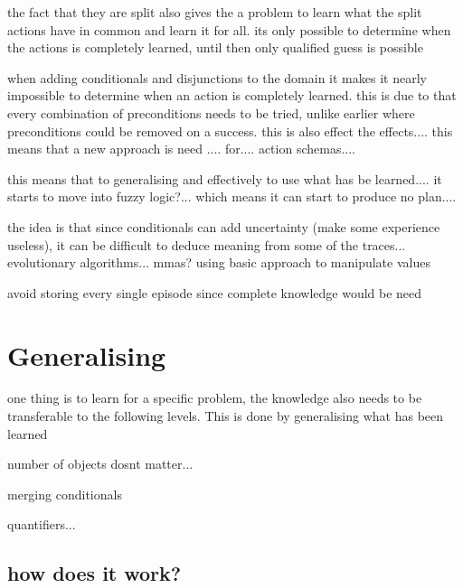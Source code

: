 	the fact that they are split also gives the a problem to learn what the split actions have in common and learn it for all. its only possible to determine when the actions is completely learned, until then only qualified guess is possible
	
	
	
	when adding conditionals and disjunctions to the domain it makes it nearly impossible to determine when an action is completely learned. this is due to that every combination of preconditions needs to be tried, unlike earlier where preconditions could be removed on a success. this is also effect the effects.... this means that a new approach is need .... for.... action schemas....  
	
	
	this means that to generalising and effectively to use what has be learned.... it starts to move into fuzzy logic?... which means it can start to produce no plan....
	
	the idea is that since conditionals can add uncertainty (make some experience useless), it can be difficult to deduce meaning from some of the traces...  evolutionary algorithms... mmas? using basic approach to manipulate values
	
	avoid storing every single episode since complete knowledge would be need
	
\section{Generalising}	
	one thing is to learn for a specific problem, the knowledge also needs to be transferable to the following levels. This is done by generalising what has been learned
	
	
	number of objects dosnt matter...
	
	
	merging conditionals
	
	quantifiers...
	
	
	
\subsection{how does it work?}	
	
	